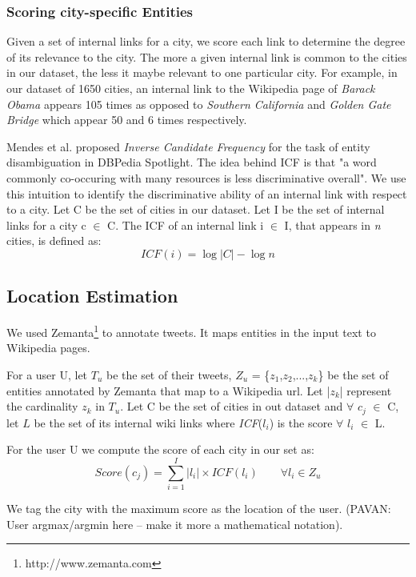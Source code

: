 \subsubsection{Scoring city-specific Entities}
Given a set of internal links for a city, we score each link to determine the degree of its relevance to the city. The more a given internal link is common to the cities in our dataset, the less it maybe relevant to one particular city. For example, in our dataset of 1650 cities, an internal link to the Wikipedia page of \textit{Barack Obama} appears 105 times as opposed to \textit{Southern California} and \textit{Golden Gate Bridge} which appear 50 and 6 times respectively. 

Mendes et al. \cite{mendes2011dbpedia} proposed \textit{Inverse Candidate Frequency} for the task of entity disambiguation in DBPedia Spotlight. The idea behind ICF is that "a word commonly co-occuring with many resources is less discriminative overall". We use this intuition to identify the discriminative ability of an internal link with respect to a city. Let C be the set of cities in our dataset. Let I be the set of internal links for a city c $\in$ C. The ICF of an internal link i $\in$ I, that appears in \textit{n} cities, is defined as:
\begin{equation}
	ICF(i) = \log |C|- \log n
\end{equation}

\subsection{Location Estimation}
We used Zemanta\footnote{http://www.zemanta.com} to annotate tweets. It maps entities in the input text to Wikipedia pages.

For a user U, let $T_{u}$ be the set of their tweets, $Z_{u}$ = \{$z_{1}$,$z_{2}$,...,$z_{k}$\} be the set of entities annotated by Zemanta that map to a Wikipedia url. Let |$z_{k}$| represent the cardinality $z_{k}$ in $T_{u}$. Let C be the set of cities in out dataset and $\forall$ $c_{j}$ $\in$ C, let $L$ be the set of its internal wiki links where \textit{ICF}($l_{i}$) is the score $\forall$ $l_{i}$ $\in$ L.

For the user U we compute the score of each city in our set as:
\begin{equation}
	Score(c_{j}) = \sum_{i=1}^I |l_{i}| \times ICF(l_{i})\qquad  \forall l_{i} \in Z_{u}
\end{equation}

We tag the city with the maximum score as the location of the user. (PAVAN: User argmax/argmin here -- make it more a mathematical notation).




